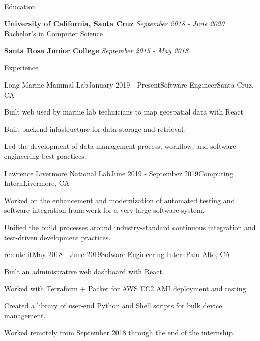 \documentclass{resume} %
\begin{document}

\begin{rSection}{Education}

    {\bf University of California, Santa Cruz} \hfill {\em September 2018 - June 2020} \\ 
    Bachelor's in Computer Science

    {\bf Santa Rosa Junior College} \hfill {\em September 2015 - May 2018}

\end{rSection}


\begin{rSection}{Experience}
    \begin{rSubsection}{Long Marine Mammal Lab}{January 2019 - Present}{Software Engineer}{Santa Cruz, CA}
        \item Built web  used by marine lab technicians to map geospatial data with React
        \item Built backend infastructure for data storage and retrieval.
        \item Led the development of data management process, workflow, and software engineering best practices.
    \end{rSubsection}

    \begin{rSubsection}{Lawrence Livermore National Lab}{June 2019 - September 2019}{Computing Intern}{Livermore, CA}
        \item Worked on the enhancement and modernization of automated testing and software integration framework for a very large software system.
        \item Unified the build processes around industry-standard continuous integration and test-driven development practices.
    \end{rSubsection}

    \begin{rSubsection}{remote.it}{May 2018 - June 2019}{Sofware Engineering Intern}{Palo Alto, CA}
        \item Built an administrative web dashboard with React.
        \item Worked with Terraform + Packer for AWS EC2 AMI deployment and testing.
        \item Created a library of user-end Python and Shell scripts for bulk device management.
        \item Worked remotely from September 2018 through the end of the internship.
    \end{rSubsection}

\end{rSection}
\end{document}
